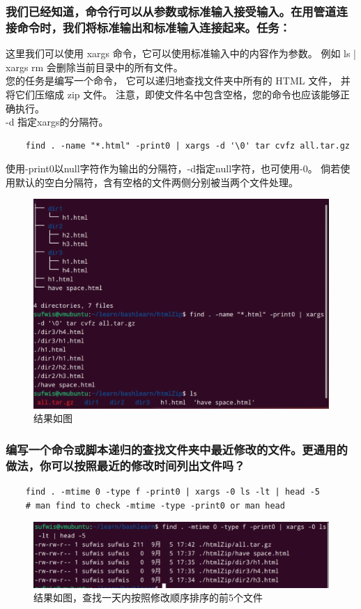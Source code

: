 \documentclass[UTF8]{ctexart}
\begin{document}
\subsubsection{我们已经知道，命令行可以从参数或标准输入接受输入。在用管道连接命令时，我们将标准输出和标准输入连接起来。任务：}
这里我们可以使用 xargs 命令，它可以使用标准输入中的内容作为参数。 
例如 ls | xargs rm 会删除当前目录中的所有文件。
\\
\indent 您的任务是编写一个命令，
它可以递归地查找文件夹中所有的 HTML 文件，
并将它们压缩成 zip 文件。
注意，即使文件名中包含空格，您的命令也应该能够正确执行。\\
\qquad -d 指定xargs的分隔符。
\begin{lstlisting}
	find . -name "*.html" -print0 | xargs -d '\0' tar cvfz all.tar.gz
\end{lstlisting}
\parbox{\linewidth}{
  \indent 使用-print0以null字符作为输出的分隔符，-d指定null字符，也可使用-0。
  倘若使用默认的空白分隔符，含有空格的文件两侧分别被当两个文件处理。%
}
\begin{figure}[H]
	\centering
	\includegraphics[width=0.7\linewidth]{figures/html.png}
	\caption{结果如图}
\end{figure}

\subsubsection{编写一个命令或脚本递归的查找文件夹中最近修改的文件。更通用的做法，你可以按照最近的修改时间列出文件吗？}
\begin{lstlisting}
	find . -mtime 0 -type f -print0 | xargs -0 ls -lt | head -5
	# man find to check -mtime -type -print0 or man head
\end{lstlisting}
\begin{figure}[H]
	\centering
	\includegraphics[width=0.7\linewidth]{figures/find_ls_t.png}
	\caption{结果如图，查找一天内按照修改顺序排序的前5个文件}
\end{figure}
\end{document}
